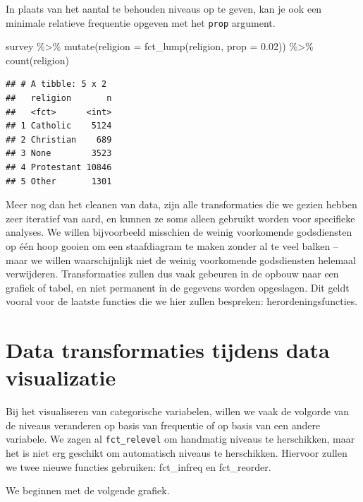\documentclass[]{tufte-book}
\newenvironment{Shaded}{}{}
\newcommand{\AttributeTok}[1]{\textcolor[rgb]{0.49,0.56,0.16}{#1}}
\newcommand{\FloatTok}[1]{\textcolor[rgb]{0.25,0.63,0.44}{#1}}
\newcommand{\FunctionTok}[1]{\textcolor[rgb]{0.02,0.16,0.49}{#1}}
\newcommand{\NormalTok}[1]{#1}
\newcommand{\SpecialCharTok}[1]{\textcolor[rgb]{0.25,0.44,0.63}{#1}}
\begin{document}
In plaats van het aantal te behouden niveaus op te geven, kan je ook een minimale relatieve frequentie opgeven met het \texttt{prop} argument.

\begin{Shaded}
\begin{Highlighting}[]
\NormalTok{survey }\SpecialCharTok{\%\textgreater{}\%}
  \FunctionTok{mutate}\NormalTok{(}\AttributeTok{religion =} \FunctionTok{fct\_lump}\NormalTok{(religion, }\AttributeTok{prop =} \FloatTok{0.02}\NormalTok{)) }\SpecialCharTok{\%\textgreater{}\%}
  \FunctionTok{count}\NormalTok{(religion)}
\end{Highlighting}
\end{Shaded}

\begin{verbatim}
## # A tibble: 5 x 2
##   religion       n
##   <fct>      <int>
## 1 Catholic    5124
## 2 Christian    689
## 3 None        3523
## 4 Protestant 10846
## 5 Other       1301
\end{verbatim}

Meer nog dan het cleanen van data, zijn alle transformaties die we gezien hebben zeer iteratief van aard, en kunnen ze soms alleen gebruikt worden voor specifieke analyses. We willen bijvoorbeeld misschien de weinig voorkomende godsdiensten op één hoop gooien om een staafdiagram te maken zonder al te veel balken -- maar we willen waarschijnlijk niet de weinig voorkomende godsdiensten helemaal verwijderen. Transformaties zullen dus vaak gebeuren in de opbouw naar een grafiek of tabel, en niet permanent in de gegevens worden opgeslagen. Dit geldt vooral voor de laatste functies die we hier zullen bespreken: herordeningsfuncties.

\hypertarget{data-transformaties-tijdens-data-visualizatie}{%
\section{Data transformaties tijdens data visualizatie}\label{data-transformaties-tijdens-data-visualizatie}}

Bij het visualiseren van categorische variabelen, willen we vaak de volgorde van de niveaus veranderen op basis van frequentie of op basis van een andere variabele. We zagen al \texttt{fct\_relevel} om handmatig niveaus te herschikken, maar het is niet erg geschikt om automatisch niveaus te herschikken. Hiervoor zullen we twee nieuwe functies gebruiken: fct\_infreq en fct\_reorder.

We beginnen met de volgende grafiek.
\end{document}
